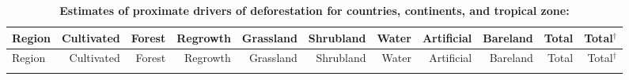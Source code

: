 	\begin{scriptsize}
	\begin{landscape}
		\begin{center}
			\begin{longtable}[ht]{lrrrrrrrrrr}
			\caption[Estimates of proximate drivers of deforestation for countries, continents, and tropical zone]{\textbf{Estimates of proximate drivers of deforestation for countries, continents, and tropical zone:}} \label{tab:proximate_driver}\\

			\hline
			Region&Cultivated&Forest&Regrowth&Grassland&Shrubland&Water&Artificial&Bareland&Total&Total$^\dagger$\\
			\hline
			\endfirsthead

			\hline
			Region&Cultivated&Forest&Regrowth&Grassland&Shrubland&Water&Artificial&Bareland&Total&Total$^\dagger$\\
			\hline
			\endhead

			\hline
			\endfoot


\end{longtable}
\end{center}
\end{landscape}
\end{scriptsize}
